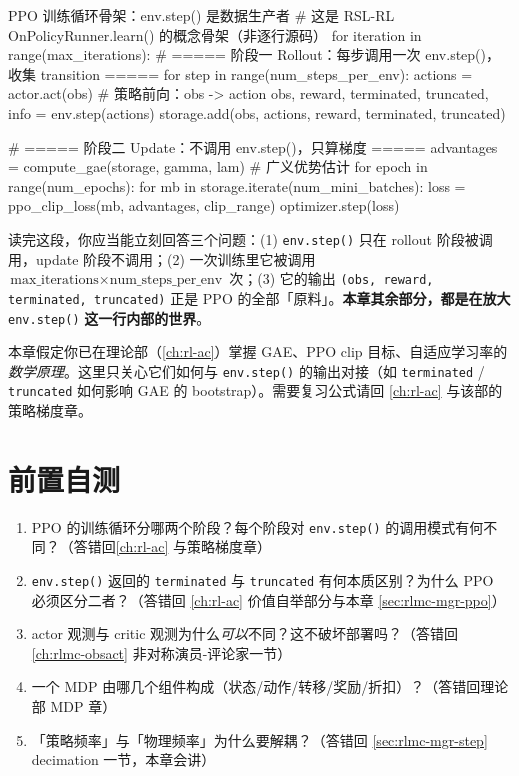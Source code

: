 \begin{codebox}[Python]{PPO 训练循环骨架：env.step() 是数据生产者}
# 这是 RSL-RL OnPolicyRunner.learn() 的概念骨架（非逐行源码）
for iteration in range(max_iterations):
    # ===== 阶段一 Rollout：每步调用一次 env.step()，收集 transition =====
    for step in range(num_steps_per_env):
        actions = actor.act(obs)                      # 策略前向：obs -> action
        obs, reward, terminated, truncated, info = env.step(actions)
        storage.add(obs, actions, reward, terminated, truncated)

    # ===== 阶段二 Update：不调用 env.step()，只算梯度 =====
    advantages = compute_gae(storage, gamma, lam)     # 广义优势估计
    for epoch in range(num_epochs):
        for mb in storage.iterate(num_mini_batches):
            loss = ppo_clip_loss(mb, advantages, clip_range)
            optimizer.step(loss)
\end{codebox}

读完这段，你应当能立刻回答三个问题：(1) \verb|env.step()| 只在 rollout 阶段被调用，update 阶段不调用；(2) 一次训练里它被调用 $\text{max\_iterations}\times\text{num\_steps\_per\_env}$ 次；(3) 它的输出 \verb|(obs, reward, terminated, truncated)| 正是 PPO 的全部「原料」。\textbf{本章其余部分，都是在放大} \verb|env.step()| \textbf{这一行内部的世界}。

\begin{note}
本章假定你已在理论部（\cref{ch:rl-ac}）掌握 GAE、PPO clip 目标、自适应学习率的\emph{数学原理}。这里只关心它们如何与 \verb|env.step()| 的输出对接（如 \verb|terminated| / \verb|truncated| 如何影响 GAE 的 bootstrap）。需要复习公式请回 \cref{ch:rl-ac} 与该部的策略梯度章。
\end{note}

\section*{前置自测}
\label{sec:rlmc-mgr-selftest}

\begin{practice}
\begin{enumerate}
  \item PPO 的训练循环分哪两个阶段？每个阶段对 \verb|env.step()| 的调用模式有何不同？（答错回\cref{ch:rl-ac} 与策略梯度章）
  \item \verb|env.step()| 返回的 \verb|terminated| 与 \verb|truncated| 有何本质区别？为什么 PPO 必须区分二者？（答错回 \cref{ch:rl-ac} 价值自举部分与本章 \cref{sec:rlmc-mgr-ppo}）
  \item actor 观测与 critic 观测为什么\emph{可以}不同？这不破坏部署吗？（答错回 \cref{ch:rlmc-obsact} 非对称演员-评论家一节）
  \item 一个 MDP 由哪几个组件构成（状态/动作/转移/奖励/折扣）？（答错回理论部 MDP 章）
  \item 「策略频率」与「物理频率」为什么要解耦？（答错回 \cref{sec:rlmc-mgr-step} decimation 一节，本章会讲）
\end{enumerate}
\end{practice}

